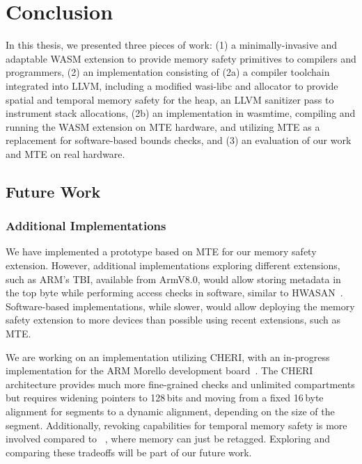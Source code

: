 \chapter{Conclusion}
\label{ch:conclusion}

In this thesis, we presented three pieces of work:
(1) a minimally-invasive and adaptable \ac{WASM} extension to provide memory safety primitives to compilers and programmers,
(2) an implementation consisting of (2a) a compiler toolchain integrated into LLVM, including a modified wasi-libc and allocator to provide spatial and temporal memory safety for the heap, an LLVM sanitizer pass to instrument stack allocations,
(2b) an implementation in wasmtime, compiling and running the \ac{WASM} extension on \ac{MTE} hardware, and utilizing \ac{MTE} as a replacement for software-based bounds checks,
and (3) an evaluation of our work and \ac{MTE} on real hardware.

\section{Future Work}
\label{sec:future-work}

\subsection{Additional Implementations}
\label{subsec:additional-implementations}

We have implemented a prototype based on \ac{MTE} for our memory safety extension.
However, additional implementations exploring different extensions, such as ARM's \ac{TBI}, available from ArmV8.0, would allow storing metadata in the top byte while performing access checks in software, similar to \ac{HWASAN}~\cite{serebryany2018memory}.
Software-based implementations, while slower, would allow deploying the memory safety extension to more devices than possible using recent extensions, such as \ac{MTE}.

We are working on an implementation utilizing \ac{CHERI}, with an in-progress implementation for the ARM Morello development board~\cite{UCAM-CL-TR-982}.
The CHERI architecture provides much more fine-grained checks and unlimited compartments but requires widening pointers to 128\,bits and moving from a fixed 16\,byte alignment for segments to a dynamic alignment, depending on the size of the segment.
Additionally, revoking capabilities for temporal memory safety is more involved compared to ~\cite{xia2019cherivoke}, where memory can just be retagged.
Exploring and comparing these tradeoffs will be part of our future work.

